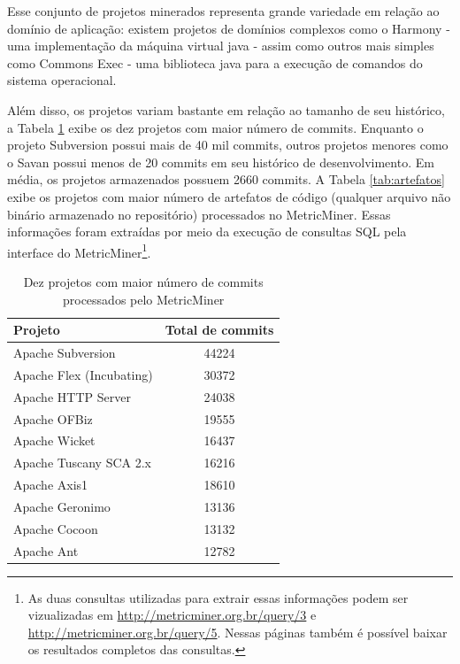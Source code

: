 \documentclass[a4paper, 12pt, twoside]{book}
\begin{document}
        Esse conjunto de projetos minerados representa grande variedade em relação ao domínio de aplicação: existem projetos de domínios complexos como o Harmony - uma implementação da máquina virtual java - assim como outros mais simples como Commons Exec - uma biblioteca java para a execução de comandos do sistema operacional. 

        Além disso, os projetos variam bastante em relação ao tamanho de seu histórico, a Tabela \ref{tab:commits} exibe os dez projetos com maior número de commits. Enquanto o projeto Subversion possui mais de 40 mil commits, outros projetos menores como o Savan possui menos de 20 commits em seu histórico de desenvolvimento. Em média, os projetos armazenados possuem 2660 commits. A Tabela \ref{tab:artefatos} exibe os projetos com maior número de artefatos de código (qualquer arquivo não binário armazenado no repositório) processados no MetricMiner. Essas informações foram extraídas por meio da execução de consultas SQL pela interface do MetricMiner\footnote{As duas consultas utilizadas para extrair essas informações podem ser vizualizadas em \url{http://metricminer.org.br/query/3} e \url{http://metricminer.org.br/query/5}. Nessas páginas também é possível baixar os resultados completos das consultas.}.

        \begin{table}\begin{center}
        \begin{tabular}{| p{6cm} | c |}
            \hline                        
            \textbf{Projeto} & \textbf{Total de commits} \\
            \hline                        
            Apache Subversion & 44224 \\
            \hline
            Apache Flex (Incubating) & 30372 \\
            \hline
            Apache HTTP Server & 24038 \\
            \hline
            Apache OFBiz & 19555 \\
            \hline
            Apache Wicket & 16437 \\
            \hline
            Apache Tuscany SCA 2.x & 16216 \\
            \hline
            Apache Axis1 & 18610 \\
            \hline
            Apache Geronimo & 13136 \\
            \hline
            Apache Cocoon & 13132 \\
            \hline
            Apache Ant & 12782 \\
            \hline
        \end{tabular}
        \caption{Dez projetos com maior número de commits processados pelo MetricMiner \label{tab:commits}}
        \end{center}\end{table}
\end{document}
